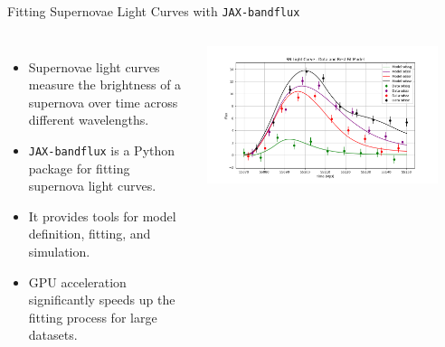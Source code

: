 \documentclass[aspectratio=169]{beamer}
\begin{document}
\begin{frame}{Fitting Supernovae Light Curves with \texttt{JAX-bandflux}}
  \begin{columns}
      \begin{itemize}
        \item Supernovae light curves measure the brightness of a supernova over time across different wavelengths.
        \item \texttt{JAX-bandflux} is a Python package for fitting supernova light curves.
        \item It provides tools for model definition, fitting, and simulation.
        \item GPU acceleration significantly speeds up the fitting process for large datasets.
      \end{itemize}
      \centering
      \includegraphics[width=0.9\textwidth]{images/sncosmo-fitter.png}
  \end{columns}
\end{frame}
\end{document}
